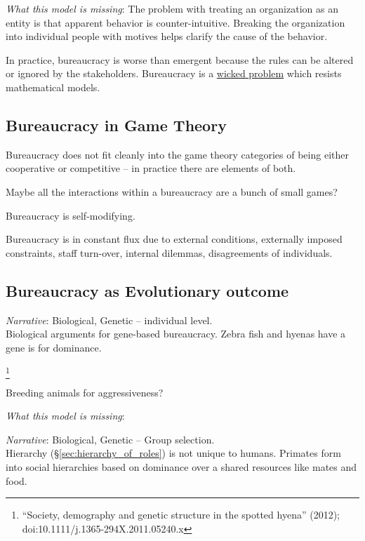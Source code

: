 \textit{What this model is missing}: The problem with treating an organization as an entity is that apparent behavior is counter-intuitive. Breaking the organization into individual people with motives helps clarify the cause of the behavior. 

In practice, bureaucracy is worse than emergent because the rules can be altered or ignored by the stakeholders. Bureaucracy is a \href{https://en.wikipedia.org/wiki/Wicked_problem}{wicked problem} which resists mathematical models. 

\subsection{Bureaucracy in Game Theory}
Bureaucracy does not fit cleanly into the game theory categories of being either cooperative or competitive -- in practice there are elements of both. 


Maybe all the interactions within a bureaucracy are a bunch of small games?

Bureaucracy is self-modifying. 

Bureaucracy is in constant flux due to external conditions, externally imposed constraints, staff turn-over, internal dilemmas, disagreements of individuals. 




\subsection{Bureaucracy as Evolutionary outcome}


\textit{Narrative}: Biological, Genetic -- individual level. \\

Biological arguments for gene-based bureaucracy. Zebra fish and hyenas have a gene is for dominance. 

\footnote{``Society, demography and genetic structure in the spotted hyena'' (2012); doi:10.1111/j.1365-294X.2011.05240.x}

Breeding animals for aggressiveness?

\textit{What this model is missing}: 

\textit{Narrative}: Biological, Genetic -- Group selection. \\
Hierarchy (\S\ref{sec:hierarchy_of_roles}) is not unique to humans. Primates form into social hierarchies based on dominance over a shared resources like mates and food.

